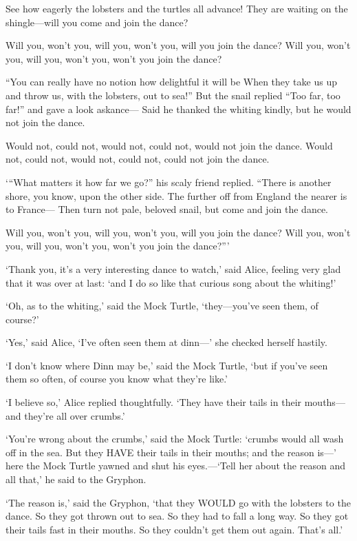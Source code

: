 \documentclass[12pt]{article}
\begin{document}
\begin{Parallel}[p]{}{}
{ See how eagerly the lobsters and the turtles all advance!
 They are waiting on the shingle—will you come and join the dance?

 Will you, won’t you, will you, won’t you, will you join the dance?
 Will you, won’t you, will you, won’t you, won’t you join the dance?

 “You can really have no notion how delightful it will be
 When they take us up and throw us, with the lobsters, out to sea!”
 But the snail replied “Too far, too far!” and gave a look askance—
 Said he thanked the whiting kindly, but he would not join the dance.

 Would not, could not, would not, could not, would not join the dance.
 Would not, could not, would not, could not, could not join the dance.

 ‘“What matters it how far we go?” his scaly friend replied.
 “There is another shore, you know, upon the other side.
 The further off from England the nearer is to France—
 Then turn not pale, beloved snail, but come and join the dance.

 Will you, won’t you, will you, won’t you, will you join the dance?
 Will you, won’t you, will you, won’t you, won’t you join the dance?”’

‘Thank you, it’s a very interesting dance to watch,’ said Alice, feeling very glad that it was over at last: ‘and I do so like that curious song about the whiting!’

‘Oh, as to the whiting,’ said the Mock Turtle, ‘they—you’ve seen them, of course?’

‘Yes,’ said Alice, ‘I’ve often seen them at dinn—’ she checked herself hastily.

‘I don’t know where Dinn may be,’ said the Mock Turtle, ‘but if you’ve seen them so often, of course you know what they’re like.’

‘I believe so,’ Alice replied thoughtfully. ‘They have their tails in their mouths—and they’re all over crumbs.’

‘You’re wrong about the crumbs,’ said the Mock Turtle: ‘crumbs would all wash off in the sea. But they HAVE their tails in their mouths; and the reason is—’ here the Mock Turtle yawned and shut his eyes.—‘Tell her about the reason and all that,’ he said to the Gryphon.

‘The reason is,’ said the Gryphon, ‘that they WOULD go with the lobsters to the dance. So they got thrown out to sea. So they had to fall a long way. So they got their tails fast in their mouths. So they couldn’t get them out again. That’s all.’

}
\end{Parallel}
\end{document}
